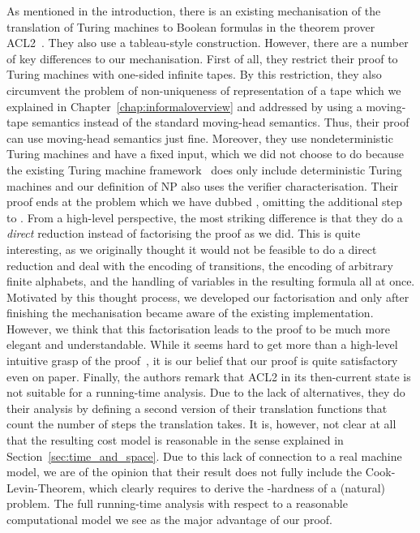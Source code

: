 As mentioned in the introduction, there is an existing mechanisation of the translation of Turing machines to Boolean formulas in the theorem prover ACL2~\cite{gamboa:cook}. They also use a tableau-style construction. However, there are a number of key differences to our mechanisation. 
First of all, they restrict their proof to Turing machines with one-sided infinite tapes. By this restriction, they also circumvent the problem of non-uniqueness of representation of a tape which we explained in Chapter~\ref{chap:informaloverview} and addressed by using a moving-tape semantics instead of the standard moving-head semantics. Thus, their proof can use moving-head semantics just fine. 
Moreover, they use nondeterministic Turing machines and have a fixed input, which we did not choose to do because the existing Turing machine framework~\cite{ForsterEtAl:2019:VerifiedTMs} does only include deterministic Turing machines and our definition of NP also uses the verifier characterisation. Their proof ends at the problem which we have dubbed \fsat{}, omitting the additional step to \sat{}. 
From a high-level perspective, the most striking difference is that they do a \emph{direct} reduction instead of factorising the proof as we did. This is quite interesting, as we originally thought it would not be feasible to do a direct reduction and deal with the encoding of transitions, the encoding of arbitrary finite alphabets, and the handling of variables in the resulting formula all at once. Motivated by this thought process, we developed our factorisation and only after finishing the mechanisation became aware of the existing implementation. 
However, we think that this factorisation leads to the proof to be much more elegant and understandable. While it seems hard to get more than a high-level intuitive grasp of the proof~\cite{gamboa:cook}, it is our belief that our proof is quite satisfactory even on paper.
Finally, the authors remark that ACL2 in its then-current state is not suitable for a running-time analysis. Due to the lack of alternatives, they do their analysis by defining a second version of their translation functions that count the number of steps the translation takes. It is, however, not clear at all that the resulting cost model is reasonable in the sense explained in Section~\ref{sec:time_and_space}.
Due to this lack of connection to a real machine model, we are of the opinion that their result does not fully include the Cook-Levin-Theorem, which clearly requires to derive the \NP{}-hardness of a (natural) problem.
The full running-time analysis with respect to a reasonable computational model we see as the major advantage of our proof.

